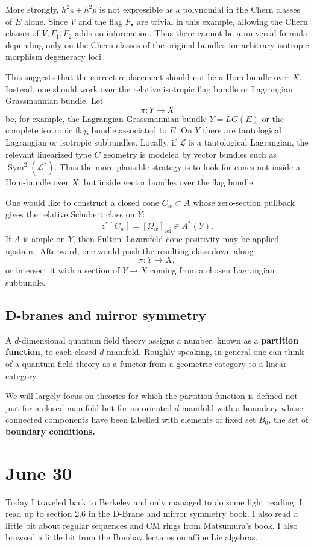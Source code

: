 \documentclass[12pt]{article}
\begin{document}
\begin{example}
    More strongly, $h^2z+h^2p$ is not expressible as a polynomial in the Chern classes of $E$ alone. Since $V$ and the flag $F_\bullet$ are trivial in this example, allowing the Chern classes of $V,F_1,F_2$ adds no information. Thus there cannot be a universal formula depending only on the Chern classes of the original bundles for arbitrary isotropic morphism degeneracy loci.
\end{example}

This suggests that the correct replacement should not be a Hom-bundle over $X$. Instead, one should work over the relative isotropic flag bundle or Lagrangian Grassmannian bundle. Let
\[
    \pi:Y\to X
\]
be, for example, the Lagrangian Grassmannian bundle $Y=LG(E)$ or the complete isotropic flag bundle associated to $E$. On $Y$ there are tautological Lagrangian or isotropic subbundles. Locally, if $\mathcal L$ is a tautological Lagrangian, the relevant linearized type $C$ geometry is modeled by vector bundles such as $\operatorname{Sym}^2(\mathcal L^*)$.
Thus the more plausible strategy is to look for cones not inside a Hom-bundle over $X$, but inside vector bundles over the flag bundle.

One would like to construct a closed cone $C_w\subset A$
whose zero-section pullback gives the relative Schubert class on $Y$:
\[
    z^*[C_w]=[\Omega_w]_{\mathrm{rel}}\in A^*(Y).
\]
If $A$ is ample on $Y$, then Fulton--Lazarsfeld cone positivity may be applied upstairs. Afterward, one would push the resulting class down along
\[
    \pi:Y\to X,
\]
or intersect it with a section of $Y\to X$ coming from a chosen Lagrangian subbundle.

\subsection{D-branes and mirror symmetry}
A $d$-dimensional quantum field theory assigns a number, known as a \textbf{partition function}, to each closed $d$-manifold. Roughly speaking, in general one can think of a quantum field theory as a functor from a geometric category to a linear category.

We will largely focus on theories for which the partition function is defined not just for a closed manifold but
for an oriented $d$-manifold with a boundary whose connected components have been labelled with elements of fixed set $B_0$, the set of \textbf{boundary conditions.}

\section{June 30}
Today I traveled back to Berkeley and only managed to do some light reading. I read up to section 2.6 in the D-Brane and mirror symmetry book. I also read a little bit about regular sequences and CM rings from Matsumura's book. I also browsed a little bit from the Bombay lectures on affine Lie algebras.
\end{document}
